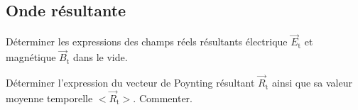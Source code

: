         \subsection{Onde résultante}
        \begin{quest}
            \item Déterminer les expressions des champs réels résultants électrique \(\Vec{E}_{\mathrm{t}}\) et magnétique \(\Vec{B}_{\mathrm{t}}\) dans le vide.
            \sol{






}
            \item Déterminer l'expression du vecteur de Poynting résultant \(\Vec{R}_{\mathrm{t}}\) ainsi que sa valeur moyenne temporelle \(<\Vec{R}_{\mathrm{t}}>\). Commenter.
\end{quest}
